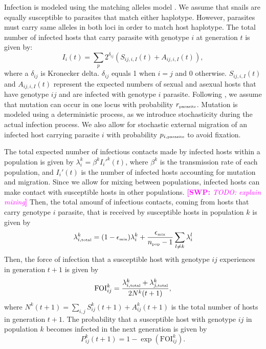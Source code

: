 \documentclass{article}\usepackage[]{graphicx}\usepackage[]{color}
\newcommand{\comment}[3]{\textcolor{#1}{\textbf{[#2: }\textit{#3}\textbf{]}}}
\newcommand{\swp}[1]{\comment{magenta}{SWP}{#1}}
\begin{document}
Infection is modeled using the matching alleles model \citep{otto1998evolution}.
We assume that snails are equally susceptible to parasites that match either haplotype.
However, parasites must carry same alleles in both loci in order to match host haplotype.
The total number of infected hosts that carry parasite with genotype $i$ at generation $t$ is given by:
\begin{equation}
I_{i}(t) = \sum_{p} 2^{\delta_{ij}} \left( S_{ij,i,I}(t) + A_{ij,i,I}(t)\right),
\end{equation}
where a $\delta_{ij}$ is Kronecker delta.
$\delta_{ij}$ equals 1 when $i = j$ and 0 otherwise.
$S_{ij,i,I}(t)$ and $A_{ij,i,I}(t)$ represent the expected numbers of sexual and asexual hosts that have genotype $ij$ and are infected with genotype $i$ parasite. 
Following \cite{ashby2015diversity}, we assume that mutation can occur in one locus with probability $r_{\textrm{\tiny parasite}}$. 
Mutation is modeled using a deterministic process, as we introduce stochasticity during the actual infection process.
We also allow for stochastic external migration of an infected host carrying parasite $i$ with probability $p_{i, \textrm{\tiny parasite}}$ to avoid fixation.

The total expected number of infectious contacts made by infected hosts within a population is given by $\lambda_i^k = \beta^k {I_i'}^k(t)$, where $\beta^k$ is the transmission rate of each population, and $I_i'(t)$ is the number of infected hosts accounting for mutation and migration.  
Since we allow for mixing between populations, infected hosts can make contact with susceptible hosts in other populations. \swp{TODO: explain mixing}
Then, the total amounf of infectious contacts, coming from hosts that carry genotype $i$ parasite, that is received by susceptible hosts in population $k$ is given by
\begin{equation}
\lambda_{i, \textrm{\tiny total}}^k = (1 - \epsilon_{\textrm{\tiny mix}}) \lambda_i^k + \frac{\epsilon_{\textrm{\tiny mix}}}{n_\textrm{\tiny pop}-1} \sum_{l \neq k} \lambda_i^l
\end{equation}
Then, the force of infection that a susceptible host with genotype $ij$ experiences in generation $t+1$ is given by
\begin{equation}
\mathrm{FOI}_{ij}^k = \frac{\lambda_{i, \textrm{\tiny total}}^k  + \lambda_{j, \textrm{\tiny total}}^k}{2 N^k(t+1)},
\end{equation}
where $N^k(t+1) = \sum_{i,j} S_{ij}^k(t+1) + A_{ij}^k(t+1)$ is the total number of hosts in generation $t+1$.
The probability that a susceptible host with genotype $ij$ in population $k$ becomes infected in the next generation is given by
\begin{equation}
P_{ij}^k(t+1) = 1 - \exp\left(\mathrm{FOI}_{ij}^k\right).
\end{equation}
\end{document}
